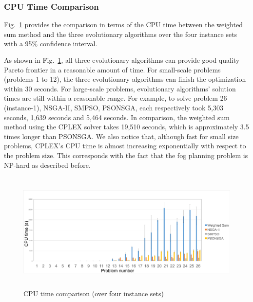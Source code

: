 \documentclass[10pt,journal,compsoc]{IEEEtran}
\newcommand{\Fig}[1]{Fig.~\ref{#1}}
\begin{document}
\begin{table}[ht]
\centering
\caption{Delay gap comparison (over four instance sets)}\label{delaygapss}
\end{table}


\subsubsection{CPU Time Comparison}
\Fig{cputimeover4} provides the comparison in terms of the CPU time between the weighted sum method and the three evolutionary algorithms over the four instance sets with a 95\% confidence interval. 

As shown in \Fig{cputimeover4}, all three evolutionary algorithms can provide good quality Pareto frontier in a reasonable amount of time. For small-scale problems (problems 1 to 12), the three evolutionary algorithms can finish the optimization within 30 seconds. For large-scale problems, evolutionary algorithms' solution times are still within a reasonable range. For example, to solve problem 26 (instance-1), NSGA-II, SMPSO, PSONSGA, each respectively took 5,303 seconds, 1,639 seconds and 5,464 seconds. In comparison, the weighted sum method using the CPLEX solver takes 19,510 seconds, which is approximately 3.5 times longer than PSONSGA. We also notice that, although fast for small size problems, CPLEX's CPU time is almost increasing exponentially with respect to the problem size. This corresponds with the fact that the fog planning problem is NP-hard as described before.

\begin{figure}[ht]
\centerline{\includegraphics[page=1,width=\textwidth,height=6cm]{cputimeover4}}
\caption{CPU time comparison (over four instance sets)} 
\label{cputimeover4}
\end{figure}
\end{document}
